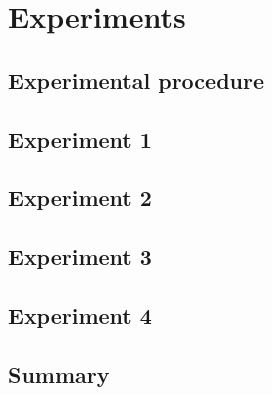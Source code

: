 \chapter{Experiments} \label{chap-5}



\section{Experimental procedure}



\section{Experiment 1}



\section{Experiment 2}



\section{Experiment 3}



\section{Experiment 4}



\section{Summary}
